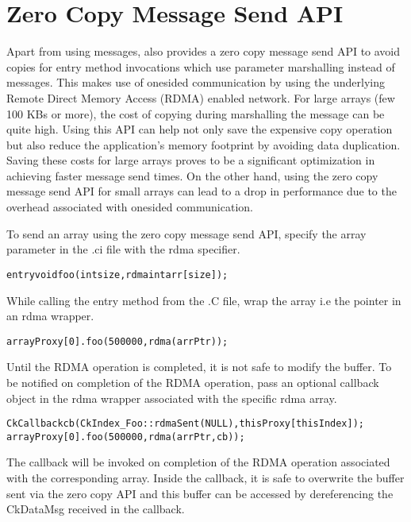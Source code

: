 \section{Zero Copy Message Send API}

\label{nocopyapi}
Apart from using messages, \charmpp{} also provides a zero copy message send
API to avoid copies for entry method invocations which use parameter marshalling
instead of messages. This makes use of onesided communication by using the
underlying Remote Direct Memory Access (RDMA) enabled network.
For large arrays (few 100 KBs or more), the cost of copying during marshalling
the message can be quite high. Using this API can help not only save
the expensive copy operation but also reduce the application's memory footprint
by avoiding data duplication. Saving these costs for large arrays proves
to be a significant optimization in achieving faster message send times.
On the other hand, using the zero copy message send API for small arrays can lead
to a drop in performance due to the overhead associated with onesided communication.

\vspace{0.1in}
\noindent
To send an array using the zero copy message send API, specify the array parameter
in the .ci file with the rdma specifier.

\begin{alltt}
entry void foo (int size, rdma int arr[size]);
\end{alltt}

While calling the entry method from the .C file, wrap the array i.e the
pointer in an rdma wrapper.

\begin{alltt}
arrayProxy[0].foo(500000, rdma(arrPtr));
\end{alltt}

Until the RDMA operation is completed, it is not safe to modify the buffer.
To be notified on completion of the RDMA operation, pass an optional callback object
in the rdma wrapper associated with the specific rdma array.

\begin{alltt}
CkCallback cb(CkIndex_Foo::rdmaSent(NULL), thisProxy[thisIndex]);
arrayProxy[0].foo(500000, rdma(arrPtr, cb));
\end{alltt}

The callback will be invoked on completion of the RDMA operation associated with the
corresponding array. Inside the callback, it is safe to overwrite the buffer sent
via the zero copy API and this buffer can be accessed by dereferencing the CkDataMsg
received in the callback.

